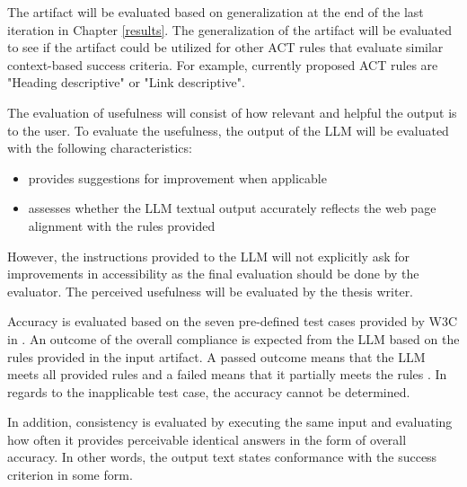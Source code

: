 The artifact will be evaluated based on generalization at the end of the last iteration in Chapter \ref{results}. The generalization of the artifact will be evaluated to see if the artifact could be utilized for other ACT rules that evaluate similar context-based success criteria. For example, currently proposed ACT rules are "Heading descriptive" or "Link descriptive".

The evaluation of usefulness will consist of how relevant and helpful the output is to the user. To evaluate the usefulness, the output of the LLM will be evaluated with the following characteristics: 

\begin{itemize}
    \item provides suggestions for improvement when applicable
    \item assesses whether the LLM textual output accurately reflects the web page alignment with the rules provided
\end{itemize}

However, the instructions provided to the LLM will not explicitly ask for improvements in accessibility as the final evaluation should be done by the evaluator. The perceived usefulness will be evaluated by the thesis writer.

Accuracy is evaluated based on the seven pre-defined test cases provided by W3C in \textcite{act_rule_g88}. An outcome of the overall compliance is expected from the LLM based on the rules provided in the input artifact. A passed outcome means that the LLM meets all provided rules and a failed means that it partially meets the rules \citep{act_rule_g88}. In regards to the inapplicable test case, the accuracy cannot be determined. 

In addition, consistency is evaluated by executing the same input and evaluating how often it provides perceivable identical answers in the form of overall accuracy. In other words, the output text states conformance with the success criterion in some form. 
